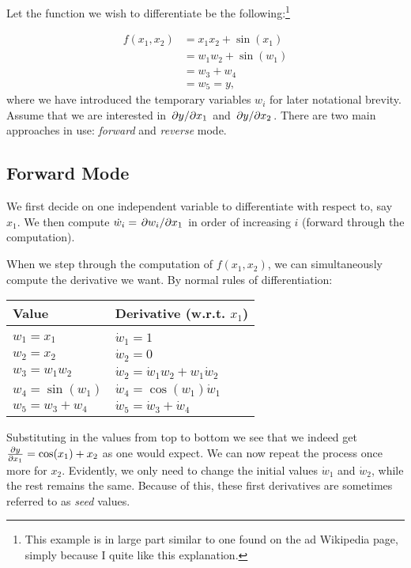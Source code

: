 \documentclass[Thesis.tex]{subfiles}
\begin{document}
Let the function we wish to differentiate be the following:\footnote{This example is in large part similar to one found
    on the \gls{ad} Wikipedia page, simply because I quite like this explanation.}

\begin{align}
  f(x_1, x_2) &= x_1x_2 + \sin(x_1)\\
              &= w_1w_2 + \sin(w_1)\\
              &= w_3 + w_4\\
              &= w_5 = y,
\end{align}
where we have introduced the temporary variables $w_i$ for later notational brevity.
Assume that we are interested in $\pdv*{y}{x_1}$ and $\pdv*{y}{x_2}$. There are
two main approaches in use: \emph{forward} and \emph{reverse} mode.

\subsection{Forward Mode}

We first decide on one independent variable to differentiate with respect to,
say $x_1$. We then compute $\dot w_i = \pdv*{w_i}{x_1}$ in order of increasing
$i$ (forward through the computation).

When we step through the computation of $f(x_1, x_2)$, we can simultaneously
compute the derivative we want. By normal rules of differentiation:

\begin{center}
  \begin{tabular}{ll}
    Value & Derivative (w.r.t. $x_1$)\\\hline\\
    $w_1 = x_1$ & $\dot w_1 = 1$\\
    $w_2 = x_2$ & $\dot w_2 = 0$\\
    $w_3 = w_1w_2$ & $\dot w_2 = \dot w_1 w_2 + w_1\dot w_2$\\
    $w_4 = \sin(w_1)$ & $\dot w_4 = \cos(w_1)\dot w_1$\\
    $w_5 = w_3 + w_4$ & $\dot w_5 = \dot w_3 +\dot w_4$\\
  \end{tabular}
\end{center}
Substituting in the values from top to bottom we see that we indeed get
$\pdv{y}{x_1}=\cos(x_1)+x_2$ as one would expect. We can now repeat the process
once more for $x_2$. Evidently, we only need to change the initial values $\dot
w_1$ and $\dot w_2$, while the rest remains the same. Because of this, these
 first derivatives are sometimes referred to as \emph{seed} values.
\end{document}
